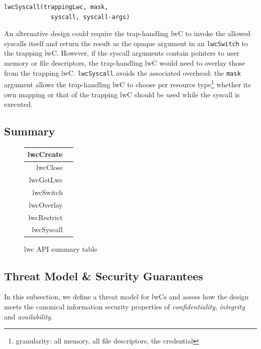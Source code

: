 \documentclass[10pt,twocolumn,letter]{article}
\begin{document}
\begin{lstlisting}[float=h]
  lwcSyscall(trappingLwc, mask,
             syscall, syscall-args)
\end{lstlisting}

An alternative design could require the trap-handling lwC to invoke the allowed syscalls itself and return the result as the opaque argument in an \lstinline{lwcSwitch} to the trapping lwC.
However, if the syscall arguments contain pointers to user memory or file descriptors, the trap-handling lwC would need to overlay those from the trapping lwC.
\lstinline{lwcSyscall} avoids the associated overhead:
the \lstinline{mask} argument allows the trap-handling lwC to choose per resource type\footnote{granularity: all memory, all file descriptors, the credential} whether its own mapping or that of the trapping lwC should be used while the syscall is executed.

\subsection{Summary}

\begin{figure}[h] %
\centering
\begin{tabular}{|r|m{1.5cm}|}
  \hline
  lwcCreate & \\
  \hline
  lwcClose & \\
  \hline
  lwcGetLwc & \\
  \hline
  lwcSwitch &  \\
  \hline
  lwcOverlay & \\
  \hline
  lwcRestrict & \\
  \hline
  lwcSyscall & \\
  \hline
\end{tabular}
  \caption{lwc API summary table}
\end{figure}


\subsection{Threat Model \& Security Guarantees}\label{design:threat}

In this subsection, we define a threat model for lwCs and assess how the design meets the canonical information security properties of \textit{confidentiality}, \textit{integrity} and \textit{availability}\cite{ciagoals}.
\end{document}
